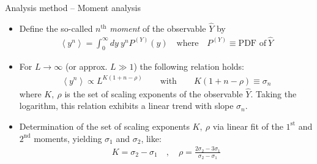 \documentclass[xcolor=dvipsnames]{beamer}
\newcommand{\myitemsep}{\setlength\itemsep{0.33cm}}
\begin{document}
    \begin{frame}[t]{Analysis method -- Moment analysis}
        \begin{itemize}
            \myitemsep
            \item {Define the so-called $n^{\mathrm{th}}$ \textit{moment} of the observable $\hat{Y}$ by
                \begin{align*}
                \left\langle y^n \right\rangle = \int_{0}^{\infty} dy\ y^n P^{(Y)}(y) \quad \text{where}
                \quad P^{(Y)}\equiv \text{PDF of}\ \hat{Y}
                \end{align*}
            }
            \item {For $L \to \infty$ (or approx. $L\gg 1$) the following relation holds:
                \begin{align*}
                \left\langle y^n \right\rangle \propto L^{K\left(1 + n - \rho \right)} \qquad \text{with}
                                                                \qquad K\left(1 + n - \rho \right) \equiv \sigma_n 
                \end{align*}
                where $K,\ \rho$ is the set of scaling exponents of the observable $\hat{Y}$. Taking the logarithm,
                this relation exhibits a linear trend with slope $\sigma_n$.
            }
            \item {Determination of the set of scaling exponents $K,\ \rho$ via linear fit of the $1^{\text{st}}$ and
                   $2^{\text{nd}}$ moments, yielding $\sigma_1$ and $\sigma_2$, like:
                \begin{align*}
                K = \sigma_2 - \sigma_1 \quad , \quad \rho = \frac{2\sigma_2 - 3\sigma_1}{\sigma_2 - \sigma_1} 
                \end{align*} 
            }
        \end{itemize}
    \end{frame}
    
\end{document}
